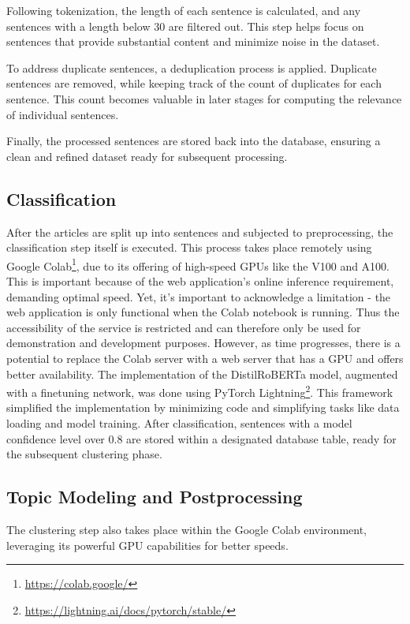 \documentclass[a4paper,10pt]{report}
\begin{document}
Following tokenization, the length of each sentence is calculated, and any sentences with a length below 30 are filtered out. This step helps focus on sentences that provide substantial content and minimize noise in the dataset.

To address duplicate sentences, a deduplication process is applied. Duplicate sentences are removed, while keeping track of the count of duplicates for each sentence. This count becomes valuable in later stages for computing the relevance of individual sentences.

Finally, the processed sentences are stored back into the database, ensuring a clean and refined dataset ready for subsequent processing.

\subsection{Classification}
After the articles are split up into sentences and subjected to preprocessing, the classification step itself is executed. This process takes place remotely using Google Colab\footnote{\url{https://colab.google/}}, due to its offering of high-speed GPUs like the V100 and A100. This is important because of the web application's online inference requirement, demanding optimal speed.
Yet, it's important to acknowledge a limitation - the web application is only functional when the Colab notebook is running. Thus the accessibility of the service is restricted and can therefore only be used for demonstration and development purposes.
However, as time progresses, there is a potential to replace the Colab server with a web server that has a GPU and offers better availability.
The implementation of the DistilRoBERTa model, augmented with a finetuning network, was done using PyTorch Lightning\footnote{\url{https://lightning.ai/docs/pytorch/stable/}}. This framework simplified the implementation by minimizing code and simplifying tasks like data loading and model training.
After classification, sentences with a model confidence level over 0.8 are stored within a designated database table, ready for the subsequent clustering phase.

\subsection{Topic Modeling and Postprocessing}
\label{subsec:clustering}
The clustering step also takes place within the Google Colab environment, leveraging its powerful GPU capabilities for better speeds.
\end{document}
